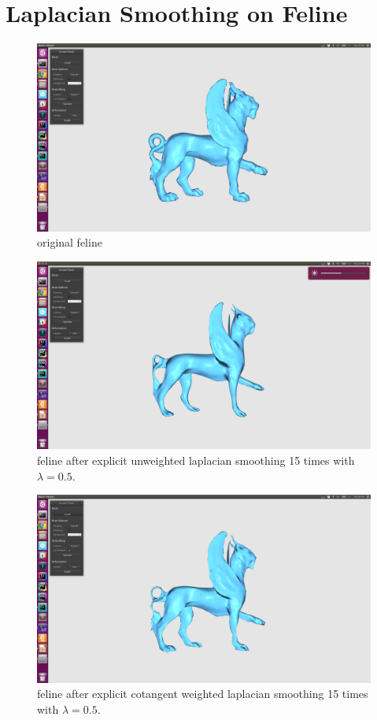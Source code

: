 \documentclass[twocolumn, a4paper]{article}
\begin{document}
\section{Laplacian Smoothing on Feline}
\begin{figure}[H]
	\centering
	\includegraphics[width=1.0\linewidth]{feline.png}
	\caption{original feline}
\end{figure}
\begin{figure}[H]
	\centering
	\includegraphics[width=1.0\linewidth]{feline_en_15.png}
	\caption{feline after explicit unweighted laplacian smoothing 15 times with $\lambda=0.5$.}
\end{figure}
\begin{figure}[H]
	\centering
	\includegraphics[width=1.0\linewidth]{feline_ec_15.png}
	\caption{feline after explicit cotangent weighted laplacian smoothing 15 times with $\lambda=0.5$.}
\end{figure}
\end{document}
